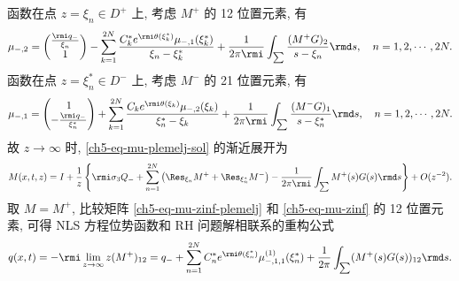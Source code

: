 函数在点 $ z = \xi_{n} \in D^{+} $ 上, 考虑 $M^{+}$ 的 12 位置元素, 有
\begin{equation}
    \mu_{-, 2} = \begin{pmatrix}
        \frac{\rmi q_{-}}{\xi_{n}} \\ 1
    \end{pmatrix}
    - \sum_{k=1}^{2N} \frac{C_{k}^{*} e^{\rmi \theta(\xi_{k}^{*})} \mu_{-, 1}(\xi_{k}^{*})}{\xi_{n} - \xi_{k}^{*}} + \frac{1}{2\pi \rmi} \int_{\sum} \frac{(M^{+} G)_{2}}{s - \xi_{n}} \rmd s, \quad n = 1, 2, \cdots, 2 N.
    \label{ch5-eq-mu-12}
\end{equation}
函数在点 $ z = \xi_{n}^{*} \in D^{-} $ 上, 考虑 $M^{-}$ 的 21 位置元素, 有
\begin{equation}
    \mu_{-, 1} = \begin{pmatrix}
        1 \\ -\frac{\rmi q_{-}}{\xi_{n}^{*}}
    \end{pmatrix}
    + \sum_{k=1}^{2N} \frac{C_{k} e^{\rmi \theta(\xi_{k})} \mu_{-, 2}(\xi_{k})}{\xi_{n}^{*} - \xi_{k}} + \frac{1}{2\pi \rmi} \int_{\sum} \frac{(M^{-} G)_{1}}{s - \xi_{n}^{*}} \rmd s, \quad n = 1, 2, \cdots, 2 N.
    \label{ch5-eq-mu-21}
\end{equation}
故 $z \to \infty$ 时, \eqref{ch5-eq-mu-plemelj-sol} 的渐近展开为
\begin{equation}
    M(x,t,z) = I + \frac{1}{z} \left\{ \rmi \sigma_{3} Q_{-} + \sum_{n=1}^{2N} \left( \Res_{\xi_{n}} M^{+} + \Res_{\xi_{n}^{*}} M^{-} \right) - \frac{1}{2\pi \rmi} \int_{\sum} M^{+}(s) G(s) \rmd s \right\} + O(z^{-2}).
    \label{ch5-eq-mu-zinf-plemelj}
\end{equation}
取 $M = M^{+}$, 比较矩阵 \eqref{ch5-eq-mu-zinf-plemelj} 和 \eqref{ch5-eq-mu-zinf} 的 12 位置元素, 可得 NLS 方程位势函数和 RH 问题解相联系的重构公式
\begin{equation}
    q(x,t) = -\rmi \lim_{z \to \infty} z (M^{+})_{12} = q_{-} + \sum_{n=1}^{2N} C_{n}^{*} e^{\rmi \theta(\xi_{n}^{*})} \mu_{-,1,1}^{(1)}(\xi_{n}^{*}) + \frac{1}{2\pi} \int_{\sum} (M^{+}(s) G(s))_{12} \rmd s.
\end{equation}
